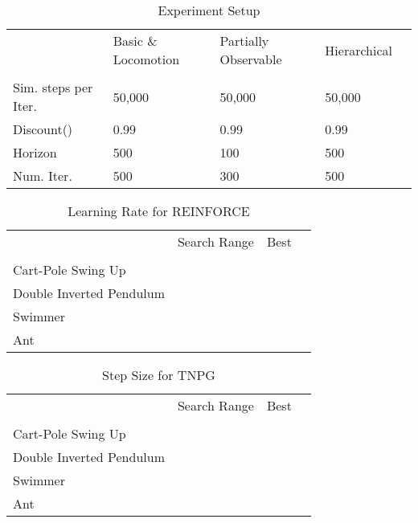 \documentclass{article}
\begin{document}
\begin{table}[!h]
\centering
\caption{Experiment Setup}
\label{experiment_setup}
\begin{tabular}{l|llll}
\cline{1-4} \\ [-8pt]
                     & Basic \& Locomotion       & Partially Observable & Hierarchical &  \\ [2pt] \cline{1-4} \\ [-8pt]
Sim. steps per Iter. & 50,000                    & 50,000               & 50,000       &  \\
Discount()  & 0.99                      & 0.99                 & 0.99         &  \\
Horizon              & 500                       & 100                  & 500          &  \\
Num. Iter.           & 500  & 300                  & 500        & \\ [2pt] \cline{1-4}
\end{tabular}
\end{table}


\begin{table}[!h]
\centering
\caption{Learning Rate  for REINFORCE}
\label{hyper_vpg}
\begin{tabular}{l|lll}
\cline{1-4} \\ [-8pt]
& Search Range              & Best                 &  \\ [2pt] \cline{1-4} \\ [-8pt]
Cart-Pole Swing Up     &             &                &  \\
Double Inverted Pendulum     &      &                &  \\
Swimmer               &             &                &  \\
Ant                   &             &                & \\ [2pt] \cline{1-4}
\end{tabular}
\end{table}

\begin{table}[!h]
\centering
\caption{Step Size  for TNPG}
\label{hyper_npg}
\begin{tabular}{l|lll}
\cline{1-4} \\ [-8pt]
 & Search Range              & Best                 &  \\ [2pt] \cline{1-4} \\ [-8pt]
Cart-Pole Swing Up     &             &                &  \\
Double Inverted Pendulum     &      &                &  \\
Swimmer               &             &                &  \\
Ant                   &             &                &  \\ [2pt] \cline{1-4}
\end{tabular}
\end{table}
\end{document}
